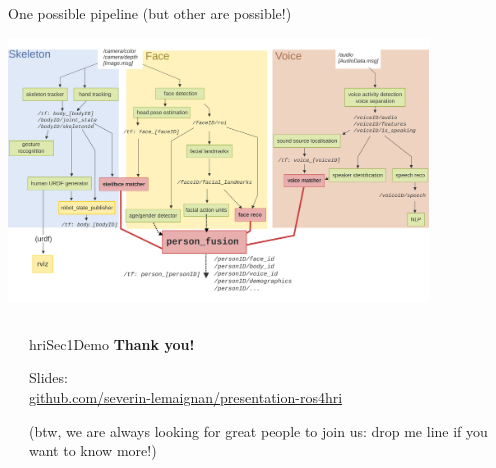 \documentclass[xcolor=table]{beamer}
\begin{document}
\begin{frame}{One possible pipeline (but other are possible!)}
    \begin{center}
        \includegraphics[height=7cm]{ros4hri/ros4hri-pipeline2}
    \end{center}
\end{frame}





{
    \begin{frame}[plain]

        \begin{columns}
            \begin{column}{0.5\linewidth}
            \end{column}
            \begin{column}{0.5\linewidth}

                \vspace{14em}
                \begin{beamercolorbox}[wd=\linewidth,ht=6ex,dp=0.7ex]{hriSec1Demo}
                    \textbf{Thank you!}

                    \vspace{4em}

                    \footnotesize
                    Slides:\\
                    {\footnotesize\href{https://github.com/severin-lemaignan/presentation-ros4hri}{github.com/severin-lemaignan/presentation-ros4hri}}

                    \vspace{2em}

                    (btw, we are always looking for great people to join us: drop me line if you want to know more!)

                \end{beamercolorbox}
            \end{column}
        \end{columns}
    \end{frame}
}

\appendix
{}
\end{document}
